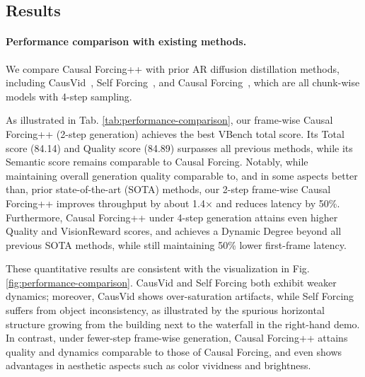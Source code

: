 \subsection{Results}


\paragraph{Performance comparison with existing methods.} We compare Causal Forcing++ with prior AR diffusion distillation methods, including CausVid~\cite{yin2025slow}, Self Forcing~\cite{huang2025self}, and Causal Forcing~\cite{zhu2026causal}, which are all chunk-wise models with 4-step sampling. 

As illustrated in Tab. \ref{tab:performance-comparison}, our frame-wise Causal Forcing++ (2-step generation) achieves the best VBench total score. Its Total score (84.14) and Quality score (84.89) surpasses all previous methods, while its Semantic score remains comparable to Causal Forcing. Notably, while maintaining overall generation quality comparable to, and in some aspects better than, prior state-of-the-art (SOTA) methods, our 2-step frame-wise Causal Forcing++ improves throughput by about 1.4× and reduces latency by 50\%. Furthermore, Causal Forcing++ under 4-step generation attains even higher Quality and VisionReward scores, and achieves a Dynamic Degree beyond all previous SOTA methods, while still maintaining 50\% lower first-frame latency.

These quantitative results are consistent with the visualization in Fig. \ref{fig:performance-comparison}. CausVid and Self Forcing both exhibit weaker dynamics; moreover, CausVid shows over-saturation artifacts, while Self Forcing suffers from object inconsistency, as illustrated by the spurious horizontal structure growing from the building next to the waterfall in the right-hand demo. In contrast, under fewer-step frame-wise generation, Causal Forcing++ attains quality and dynamics comparable to those of Causal Forcing, and even shows advantages in aesthetic aspects such as color vividness and brightness.


